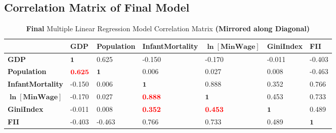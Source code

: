 \documentclass{article}
\begin{document}
\begin{appendices}
\section{Correlation Matrix of Final Model}\label{AppE}

\begin{table}[H]
    \centering
        \begin{threeparttable}
            \begin{tabular}{l l l l l l l}
              \toprule & \textbf{GDP} & \textbf{Population} & \textbf{InfantMortality} & \textbf{$\bm{\ln{[\text{MinWage}]}}$} & \textbf{GiniIndex} & \textbf{FII} \\ \midrule 
            \textbf{GDP} & $\bm{1}$ & 0.625 & -0.150 & -0.170 & -0.011 & -0.403 \\ 
            \textbf{Population} & $\bm{\textcolor{red}{0.625}}$ & $\bm{1}$ & 0.006 & 0.027 & 0.008 & -0.463 \\ 
            \textbf{InfantMortality} & -0.150 & 0.006 & $\bm{1}$ & 0.888 & 0.352 & 0.766 \\ 
            \textbf{$\bm{\ln{[\text{MinWage}]}}$} & -0.170 & 0.027 & $\bm{\textcolor{red}{0.888}}$ & $\bm{1}$ & 0.453 & 0.733 \\ 
            \textbf{GiniIndex} & -0.011 & 0.008 & $\bm{\textcolor{red}{0.352}}$ & $\bm{\textcolor{red}{0.453}}$ & $\bm{1}$ & 0.489\\ 
            \textbf{FII} & -0.403 & -0.463 & 0.766 & 0.733 & 0.489 & $\bm{1}$ \\ \bottomrule
            \end{tabular}
        \end{threeparttable}
    \caption{\label{table: corrmatrix}\textbf{Final} Multiple Linear Regression Model Correlation Matrix \textbf{(Mirrored along Diagonal)}}
\end{table}

\end{appendices}

\newpage


\end{document}
